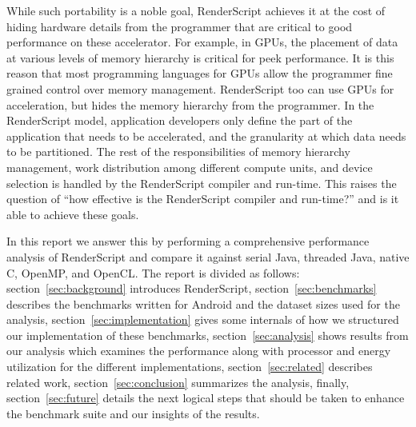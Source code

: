 While such portability is a noble goal, RenderScript achieves it at the cost of
hiding hardware details from the programmer that are critical to good
performance on these accelerator. For example, in GPUs, the placement of data at
various levels of memory hierarchy is critical for peek performance.  It is this
reason that most programming languages for GPUs allow the programmer fine grained
control over memory management. RenderScript too can use GPUs for acceleration,
but hides the memory hierarchy from the programmer. In the
RenderScript model, application developers only define the part of the
application that needs to be accelerated, and the granularity at which data
needs to be partitioned. The rest of the responsibilities of memory
hierarchy management, work distribution among different compute units, and device selection
is handled by the RenderScript compiler and run-time. 
This raises the question of ``how
effective is the RenderScript compiler and run-time?'' and is it able to achieve these goals.

In this report we answer this 
by performing a comprehensive performance analysis of RenderScript and compare it against 
serial Java, threaded Java, native C, OpenMP, and OpenCL.
The report is divided as follows: section~\ref{sec:background} introduces 
RenderScript, section~\ref{sec:benchmarks} describes the benchmarks written for Android and the dataset sizes
used for the analysis,
section~\ref{sec:implementation} gives some internals of how we structured our implementation of these benchmarks,
section~\ref{sec:analysis} shows results from our analysis which
    examines the performance along with processor and energy utilization for the different implementations,
section~\ref{sec:related} describes related work,
section~\ref{sec:conclusion} summarizes the analysis,
finally, section~\ref{sec:future} details the next logical steps that should be taken to enhance the
    benchmark suite and our insights of the results.
